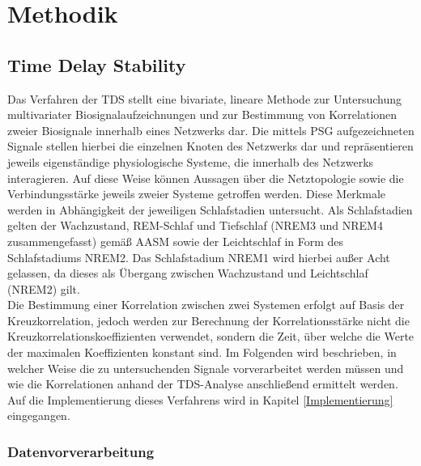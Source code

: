 \chapter{Methodik}

\section{Time Delay Stability}\label{TDS}

Das Verfahren der \acs{TDS} stellt eine bivariate, lineare Methode zur Untersuchung multivariater Biosignalaufzeichnungen und zur Bestimmung von Korrelationen zweier Biosignale innerhalb eines Netzwerks dar. Die mittels \acs{PSG} aufgezeichneten Signale stellen hierbei die einzelnen Knoten des Netzwerks dar und repräsentieren jeweils eigenständige physiologische Systeme, die innerhalb des Netzwerks interagieren. Auf diese Weise können Aussagen über die Netztopologie sowie die Verbindungsstärke jeweils zweier Systeme getroffen werden. Diese Merkmale werden in Abhängigkeit der jeweiligen Schlafstadien untersucht. Als Schlafstadien gelten der Wachzustand, \acs{REM}-Schlaf und Tiefschlaf (\acs{NREM}3 und \acs{NREM}4 zusammengefasst) gemäß \acs{AASM} sowie der Leichtschlaf in Form des Schlafstadiums \acs{NREM}2. Das Schlafstadium \acs{NREM}1 wird hierbei außer Acht gelassen, da dieses als Übergang zwischen Wachzustand und Leichtschlaf (\acs{NREM}2) gilt. \parencite{bashan_network_2012, iber_aasm_2007}\\

Die Bestimmung einer Korrelation zwischen zwei Systemen erfolgt auf Basis der Kreuzkorrelation, jedoch werden zur Berechnung der Korrelationsstärke nicht die Kreuzkorrelationskoeffizienten verwendet, sondern die Zeit, über welche die Werte der maximalen Koeffizienten konstant sind. Im Folgenden wird beschrieben, in welcher Weise die zu untersuchenden Signale vorverarbeitet werden müssen und wie die Korrelationen anhand der \acs{TDS}-Analyse anschließend ermittelt werden. Auf die Implementierung dieses Verfahrens wird in Kapitel \ref{Implementierung} eingegangen.


\subsection{Datenvorverarbeitung}\label{datenvorverarbeitung}

